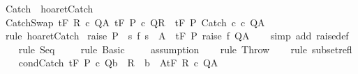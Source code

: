 \begin{isabellebody}
\endisatagproof
{\isafoldproof}%
%
\isadelimproof
\isanewline
%
\endisadelimproof
\isanewline
{}\isamarkupfalse%
\ Catch\ {\isacharequal}\ hoaret{\isachardot}Catch\isanewline
{}\isamarkupfalse%
\ CatchSwap{\isacharcolon}\ {\isachardoublequoteopen}{\isasymlbrakk}{\isasymGamma}{\isacharcomma}{\isasymTheta}{\isasymturnstile}\isactrlsub t\isactrlbsub {\isacharslash}F\isactrlesub \ R\ c\ Q{\isacharcomma}A{\isacharsemicolon}\ {\isasymGamma}{\isacharcomma}{\isasymTheta}{\isasymturnstile}\isactrlsub t\isactrlbsub {\isacharslash}F\isactrlesub \ P\ c\ Q{\isacharcomma}R{\isasymrbrakk}\ {\isasymLongrightarrow}\ {\isasymGamma}{\isacharcomma}{\isasymTheta}{\isasymturnstile}\isactrlsub t\isactrlbsub {\isacharslash}F\isactrlesub \ P\ Catch\ c\ c\ Q{\isacharcomma}A{\isachardoublequoteclose}\isanewline
%
\isadelimproof
\ \ %
\endisadelimproof
%
\isatagproof
{}\isamarkupfalse%
\ {\isacharparenleft}rule\ hoaret{\isachardot}Catch{\isacharparenright}%
\endisatagproof
{\isafoldproof}%
%
\isadelimproof
\isanewline
%
\endisadelimproof
\isanewline
{}\isamarkupfalse%
\ raise{\isacharcolon}\ {\isachardoublequoteopen}P\ {\isasymsubseteq}\ {\isacharbraceleft}s{\isachardot}\ f\ s\ {\isasymin}\ A{\isacharbraceright}\ {\isasymLongrightarrow}\ {\isasymGamma}{\isacharcomma}{\isasymTheta}{\isasymturnstile}\isactrlsub t\isactrlbsub {\isacharslash}F\isactrlesub \ P\ raise\ f\ Q{\isacharcomma}A{\isachardoublequoteclose}\isanewline
%
\isadelimproof
\ \ %
\endisadelimproof
%
\isatagproof
{}\isamarkupfalse%
\ {\isacharparenleft}simp\ add{\isacharcolon}\ raise{\isacharunderscore}def{\isacharparenright}\isanewline
\ \ \isamarkupfalse%
\ {\isacharparenleft}rule\ Seq{\isacharparenright}\isanewline
\ \ \isamarkupfalse%
\ \ {\isacharparenleft}rule\ Basic{\isacharparenright}\isanewline
\ \ \isamarkupfalse%
\ \ {\isacharparenleft}assumption{\isacharparenright}\isanewline
\ \ \isamarkupfalse%
\ {\isacharparenleft}rule\ Throw{\isacharparenright}\isanewline
\ \ \isamarkupfalse%
\ {\isacharparenleft}rule\ subset{\isacharunderscore}refl{\isacharparenright}\isanewline
\ \ \isamarkupfalse%
%
\endisatagproof
{\isafoldproof}%
%
\isadelimproof
\isanewline
%
\endisadelimproof
\isanewline
{}\isamarkupfalse%
\ condCatch{\isacharcolon}\ {\isachardoublequoteopen}{\isasymlbrakk}{\isasymGamma}{\isacharcomma}{\isasymTheta}{\isasymturnstile}\isactrlsub t\isactrlbsub {\isacharslash}F\isactrlesub \ P\ c\ Q{\isacharcomma}{\isacharparenleft}{\isacharparenleft}b\ {\isasyminter}\ R{\isacharparenright}\ {\isasymunion}\ {\isacharparenleft}{\isacharminus}b\ {\isasyminter}\ A{\isacharparenright}{\isacharparenright}{\isacharsemicolon}{\isasymGamma}{\isacharcomma}{\isasymTheta}{\isasymturnstile}\isactrlsub t\isactrlbsub {\isacharslash}F\isactrlesub \ R\ c\ Q{\isacharcomma}A{\isasymrbrakk}\ \isanewline

\end{isabellebody}
